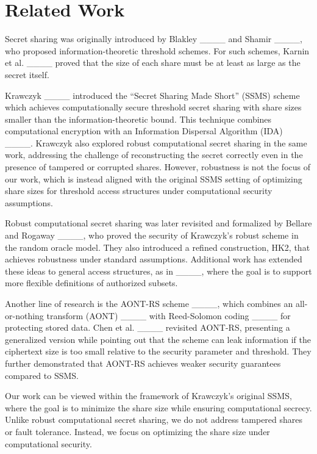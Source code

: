 \section{Related Work}
Secret sharing was originally introduced by Blakley ____ and Shamir ____, who proposed information-theoretic threshold schemes. For such schemes, Karnin et al. ____ proved that the size of each share must be at least as large as the secret itself. 

Krawczyk ____ introduced the “Secret Sharing Made Short” (SSMS) scheme which achieves computationally secure threshold secret sharing with share sizes smaller than the information-theoretic bound. This technique combines computational encryption with an Information Dispersal Algorithm (IDA) ____. Krawczyk also explored robust computational secret sharing in the same work, addressing the challenge of reconstructing the secret correctly even in the presence of tampered or corrupted shares. However, robustness is not the focus of our work, which is instead aligned with the original SSMS setting of optimizing share sizes for threshold access structures under computational security assumptions.

Robust computational secret sharing was later revisited and formalized by Bellare and Rogaway ____, who proved the security of Krawczyk’s robust scheme in the random oracle model. They also introduced a refined construction, HK2, that achieves robustness under standard assumptions. Additional work has extended these ideas to general access structures, as in ____, where the goal is to support more flexible definitions of authorized subsets.

Another line of research is the AONT-RS scheme ____, which combines an all-or-nothing transform (AONT) ____ with Reed-Solomon coding ____ for protecting stored data. Chen et al. ____ revisited AONT-RS, presenting a generalized version while pointing out that the scheme can leak information if the ciphertext size is too small relative to the security parameter and threshold. They further demonstrated that AONT-RS achieves weaker security guarantees compared to SSMS. 

Our work can be viewed within the framework of Krawczyk’s original SSMS, where the goal is to minimize the share size while ensuring computational secrecy. Unlike robust computational secret sharing, we do not address tampered shares or fault tolerance. Instead, we focus on optimizing the share size under computational security.
